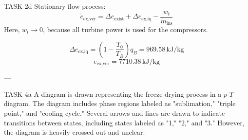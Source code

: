 TASK 2d  
Stationary flow process:  
\[
\dot{e}_{\text{ex,ver}} = \Delta e_{\text{exist}} + \Delta e_{\text{ex,iq}} - \frac{w_t}{\dot{m}_{\text{ins}}}
\]  
Here, \( w_t \to 0 \), because all turbine power is used for the compressors.  

\[
\Delta e_{\text{ex,iq}} = \left( 1 - \frac{T_0}{T_B} \right) q_B = 969.58 \, \text{kJ/kg}
\]  
\[
e_{\text{ex,ver}} = 7710.38 \, \text{kJ/kg}
\]  

---

TASK 4a  
A diagram is drawn representing the freeze-drying process in a \( p \)-\( T \) diagram. The diagram includes phase regions labeled as "sublimation," "triple point," and "cooling cycle." Several arrows and lines are drawn to indicate transitions between states, including states labeled as "1," "2," and "3." However, the diagram is heavily crossed out and unclear.  

